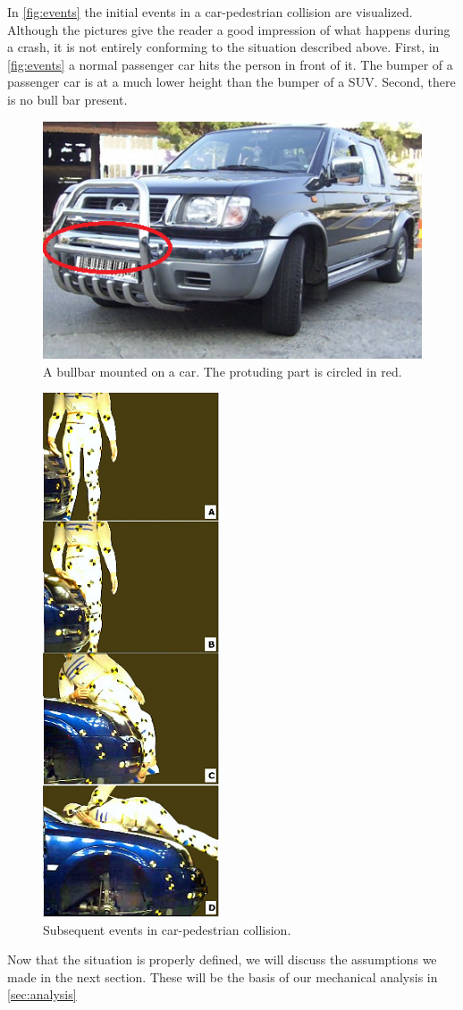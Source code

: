 In \autoref{fig:events} the initial events in a car-pedestrian collision are
visualized. Although the pictures give the reader a good impression of what
happens during a crash, it is not entirely conforming to the situation
described above. First, in \autoref{fig:events} a normal passenger car hits the
person in front of it. The bumper of a passenger car is at a much lower height
than the bumper of a SUV. Second, there is no bull bar present.

\begin{figure}[htp]
\begin{center}
  \includegraphics{img/bullbar.png}
  \caption{A bullbar mounted on a car. The protuding part is circled in red.}
  \label{fig:bullbar}
\end{center}
\end{figure}

\begin{figure}[htp]
\begin{center}
  \includegraphics{img/first_instance.png}
  \caption{Subsequent events in car-pedestrian collision.}
  \label{fig:events}
\end{center}
\end{figure}

Now that the situation is properly defined, we will discuss the
assumptions we made in the next section. These will be the basis of our
mechanical analysis in \autoref{sec:analysis}